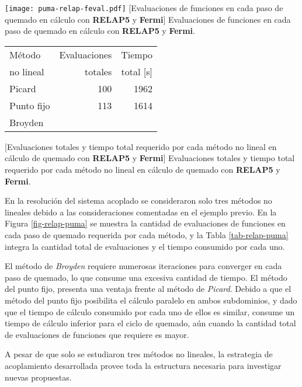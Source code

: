\begin{minipage}{\textwidth}
\begin{minipage}[b]{0.49\textwidth}
  \centering
  \texttt{[image: puma-relap-feval.pdf]}
  \label{fig-relap-puma}
  \captionsetup{width=0.8\textwidth}
  [Evaluaciones de funciones en cada paso de quemado en cálculo con \textbf{RELAP5} y \textbf{Fermi}]
  {Evaluaciones de funciones en cada paso de quemado en cálculo con \textbf{RELAP5} y \textbf{Fermi}.}
\end{minipage}
\hfill
\begin{minipage}[b]{0.49\textwidth}
  \centering
  \begin{tabular}{ l r r } \hline
      Método & Evaluaciones & Tiempo \\
      no lineal & totales & total [s] \\ \hline %
      Picard & 100 & 1962 \\ %
      Punto fijo & 113 & 1614  \\ %
      Broyden &  &  \\ \hline
   \end{tabular}
   \label{tab-relap-puma}
   \captionsetup{width=0.8\textwidth}
   [Evaluaciones totales y tiempo total requerido por cada método no lineal en cálculo de quemado con \textbf{RELAP5} y \textbf{Fermi}]
   {Evaluaciones totales y tiempo total requerido por cada método no lineal en cálculo de quemado con \textbf{RELAP5} y \textbf{Fermi}.}
  \end{minipage}
\end{minipage}

En la resolución del sistema acoplado se consideraron solo tres métodos no lineales debido a las consideraciones comentadas en el ejemplo previo.
En la Figura \ref{fig-relap-puma} se muestra la cantidad de evaluaciones de funciones en cada paso de quemado requerida por cada método,
y la Tabla \ref{tab-relap-puma} integra la cantidad total de evaluaciones y el tiempo consumido por cada uno.

El método de \textit{Broyden} requiere numerosas iteraciones para converger en cada paso de quemado, lo que consume una excesiva cantidad de tiempo.
El método del punto fijo, presenta una ventaja frente al método de \textit{Picard}.
Debido a que el método del punto fijo posibilita el cálculo paralelo en ambos subdominios, y dado que el tiempo de cálculo consumido por cada uno de ellos es similar,
consume un tiempo de cálculo inferior para el ciclo de quemado, aún cuando la cantidad total de evaluaciones de funciones que requiere es mayor.

A pesar de que solo se estudiaron tres métodos no lineales, la estrategia de acoplamiento desarrollada provee toda la estructura necesaria para investigar nuevas propuestas.
